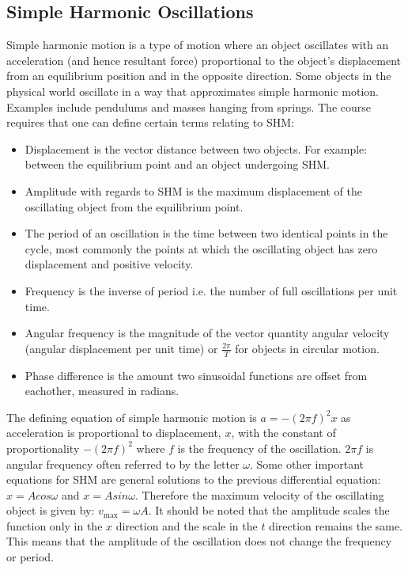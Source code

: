 \documentclass[a4,8pt]{article} \usepackage[margin=3cm,includefoot]{geometry}
\begin{document}
\subsection{Simple Harmonic Oscillations}
Simple harmonic motion is a type of motion where an object oscillates with an
acceleration (and hence resultant force) proportional to the object's
displacement from an equilibrium position and in the opposite direction. Some
objects in the physical world oscillate in a way that approximates simple
harmonic motion. Examples include pendulums and masses hanging from springs. The
course requires that one can define certain terms relating to SHM:\@
\begin{itemize}
	\item Displacement is the vector distance between two objects. For
          example: between the equilibrium point and an object undergoing SHM.\@
	\item Amplitude with regards to SHM is the maximum displacement of the
          oscillating object from the equilibrium point.
	\item The period of an oscillation is the time between two identical
          points in the cycle, most commonly the points at which the oscillating
          object has zero displacement and positive velocity.
	\item Frequency is the inverse of period i.e. the number of full
          oscillations per unit time.
	\item Angular frequency is the magnitude of the vector quantity angular
          velocity (angular displacement per unit time) or $\frac{2\pi}{T}$ for
          objects in circular motion.
	\item Phase difference is the amount two sinusoidal functions are offset
          from eachother, measured in radians.
\end{itemize}

The defining equation of simple harmonic motion is $a=-{(2\pi f)}^2 x$ as
acceleration is proportional to displacement, $x$, with the constant of
proportionality $-{(2\pi f)}^2$ where $f$ is the frequency of the oscillation.
$2\pi f$ is angular frequency often referred to by the letter $\omega$. Some
other important equations for SHM are general solutions to the previous
differential equation: $x=Acos\omega$ and $x=Asin\omega$. Therefore the maximum
velocity of the oscillating object is given by: $v_\text{max}=\omega A$. It
should be noted that the amplitude scales the function only in the $x$ direction
and the scale in the $t$ direction remains the same. This means that the
amplitude of the oscillation does not change the frequency or period.
\vspace{8pt}
\end{document}
